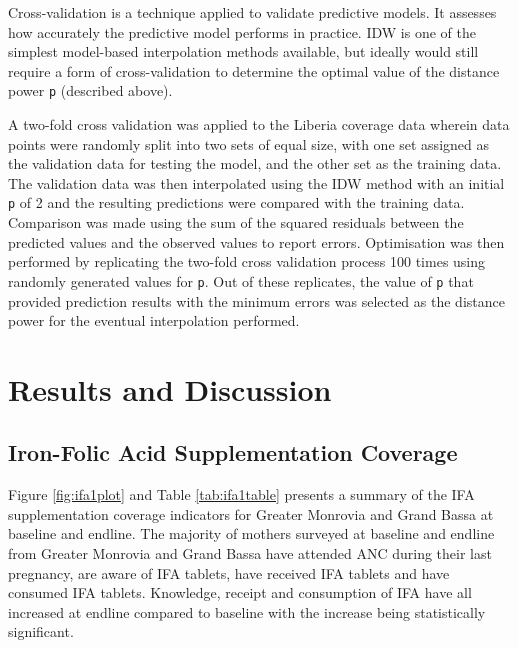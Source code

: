 \documentclass[12pt,a4paper]{article}
\begin{document}
Cross-validation is a technique applied to validate predictive models. It assesses how accurately the predictive model performs in practice. IDW is one of the simplest model-based interpolation methods available, but ideally would still require a form of cross-validation to determine the optimal value of the distance power \texttt{p} (described above).

A two-fold cross validation \citep{bivand2008applied} was applied to the Liberia coverage data wherein data points were randomly split into two sets of equal size, with one set assigned as the validation data for testing the model, and the other set as the training data. The validation data was then interpolated using the IDW method with an initial \texttt{p} of 2 and the resulting predictions were compared with the training data. Comparison was made using the sum of the squared residuals between the predicted values and the observed values to report errors. Optimisation was then performed by replicating the two-fold cross validation process 100 times using randomly generated values for \texttt{p}. Out of these replicates, the value of \texttt{p} that provided prediction results with the minimum errors was selected as the distance power for the eventual interpolation performed.

\hypertarget{results-and-discussion}{%
\section{Results and Discussion}\label{results-and-discussion}}

\hypertarget{iron-folic-acid-supplementation-coverage}{%
\subsection{Iron-Folic Acid Supplementation Coverage}\label{iron-folic-acid-supplementation-coverage}}

Figure \ref{fig:ifa1plot} and Table \ref{tab:ifa1table} presents a summary of the IFA supplementation coverage indicators for Greater Monrovia and Grand Bassa at baseline and endline. The majority of mothers surveyed at baseline and endline from Greater Monrovia and Grand Bassa have attended ANC during their last pregnancy, are aware of IFA tablets, have received IFA tablets and have consumed IFA tablets. Knowledge, receipt and consumption of IFA have all increased at endline compared to baseline with the increase being statistically significant.
\end{document}

